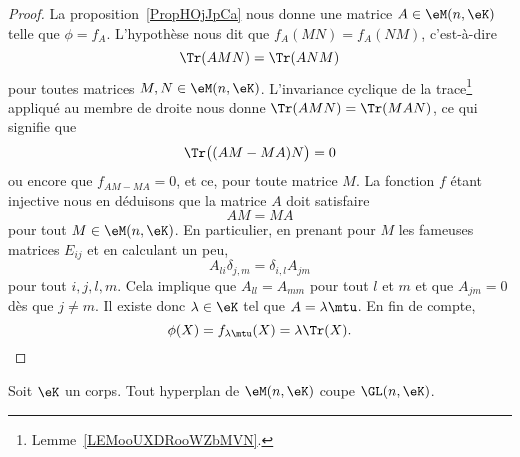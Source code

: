 \begin{proof}
	La proposition~\ref{PropHOjJpCa} nous donne une matrice \( A\in \eM(n,\eK)\) telle que \( \phi=f_A\). L'hypothèse nous dit que \( f_A(MN)=f_A(NM)\), c'est-à-dire
	\begin{equation}
		\Tr(AMN)=\Tr(ANM)
	\end{equation}
	pour toutes matrices \( M, N\in \eM(n,\eK)\). L'invariance cyclique de la trace\footnote{Lemme~\ref{LEMooUXDRooWZbMVN}.} appliqué au membre de droite nous donne \( \Tr(AMN)=\Tr(MAN)\), ce qui signifie que
	\begin{equation}
		\Tr\big( (AM-MA)N \big)=0
	\end{equation}
	ou encore que \( f_{AM-MA}=0\), et ce, pour toute matrice \( M\). La fonction \( f\) étant injective nous en déduisons que la matrice \( A\) doit satisfaire
	\begin{equation}
		AM=MA
	\end{equation}
	pour tout \( M\in\eM(n,\eK)\). En particulier, en prenant pour \( M \) les fameuses matrices \( E_{ij}\) et en calculant un peu,
	\begin{equation}
		A_{li}\delta_{j,m}=\delta_{i,l}A_{jm}
	\end{equation}
	pour tout \( i,j,l,m\). Cela implique que \( A_{ll}=A_{mm}\) pour tout \( l\) et \( m\) et que \( A_{jm}=0\) dès que \( j\neq m\). Il existe donc \( \lambda\in \eK\) tel que \( A=\lambda\mtu\). En fin de compte,
	\begin{equation}
		\phi(X)=f_{\lambda\mtu}(X)=\lambda\Tr(X).
	\end{equation}
\end{proof}

\begin{corollary}       \label{CorICUOooPsZQrg}
	Soit \( \eK\) un corps. Tout hyperplan de \( \eM(n,\eK)\) coupe \( \GL(n,\eK)\).
\end{corollary}

